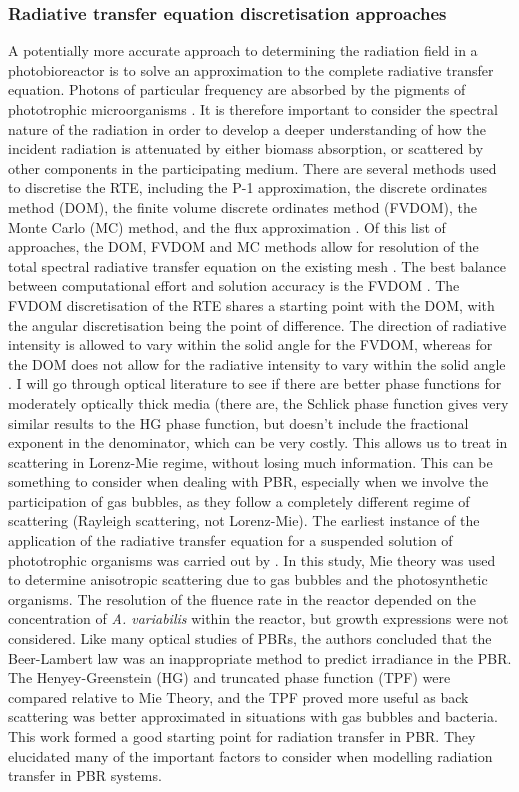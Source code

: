 \subsubsection{Radiative transfer equation discretisation approaches}
\label{S:2.3.2}
A potentially more accurate approach to determining the radiation field in a photobioreactor is to solve an approximation to the complete radiative transfer equation. Photons of particular frequency are absorbed by the pigments of phototrophic microorganisms \cite{mcdermott1995}. It is therefore important to consider the spectral nature of the radiation in order to develop a deeper understanding of how the incident radiation is attenuated by either biomass absorption, or scattered by other components in the participating medium. There are several methods used to discretise the RTE, including the P-1 approximation, the discrete ordinates method (DOM), the finite volume discrete ordinates method (FVDOM), the Monte Carlo (MC) method, and the flux approximation \cite{coelho2008}. Of this list of approaches, the DOM, FVDOM and MC methods allow for resolution of the total spectral radiative transfer equation on the existing mesh \cite{kong2014}. The best balance between computational effort and solution accuracy is the FVDOM \cite{modest2003,kong2014} . The FVDOM discretisation of the RTE shares a starting point with the DOM, with the angular discretisation being the point of difference. The direction of radiative intensity is allowed to vary within the solid angle for the FVDOM, whereas for the DOM does not allow for the radiative intensity to vary within the solid angle \cite{coelho2014}.
\skippingparagraph
I will go through optical literature to see if there are better phase functions for moderately optically thick media (there are, the Schlick phase function gives very similar results to the HG phase function, but doesn't include the fractional exponent in the denominator, which can be very costly. This allows us to treat in scattering in Lorenz-Mie regime, without losing much information. This can be something to consider when dealing with PBR, especially when we involve the participation of gas bubbles, as they follow a completely different regime of scattering (Rayleigh scattering, not Lorenz-Mie).
\skippingparagraph
The earliest instance of the application of the radiative transfer equation for a suspended solution of phototrophic organisms was carried out by \cite{berberoglu2007}. In this study, Mie theory was used to determine anisotropic scattering due to gas bubbles and the photosynthetic organisms. The resolution of the fluence rate in the reactor depended on the concentration of \textit{A. variabilis} within the reactor, but growth expressions were not considered. Like many optical studies of PBRs, the authors concluded that the Beer-Lambert law was an inappropriate method to predict irradiance in the PBR. The Henyey-Greenstein (HG) and truncated phase function (TPF) were compared relative to Mie Theory, and the TPF proved more useful as back scattering was better approximated in situations with gas bubbles and bacteria. This work formed a good starting point for radiation transfer in PBR. They elucidated many of the important factors to consider when modelling radiation transfer in PBR systems. \skippingparagraph
